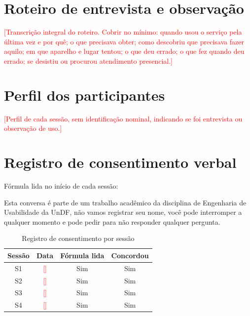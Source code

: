 \documentclass[
  12pt,
  oneside,
  a4paper,
  chapter=TITLE,
  section=TITLE,
  english,
  brazil
]{abntex2}
\newcommand{\preencher}[1]{\textcolor{red}{[#1]}}
\begin{document}
\begin{apendicesenv}
\partapendices

\chapter{Roteiro de entrevista e observação}\label{ap:roteiro}
\preencher{Transcrição integral do roteiro. Cobrir no mínimo: quando usou o
serviço pela última vez e por quê; o que precisava obter; como descobriu que
precisava fazer aquilo; em que aparelho e lugar tentou; o que deu errado; o que
fez quando deu errado; se desistiu ou procurou atendimento presencial.}

\chapter{Perfil dos participantes}\label{ap:perfil}
\preencher{Perfil de cada sessão, sem identificação nominal, indicando se foi
entrevista ou observação de uso.}

\chapter{Registro de consentimento verbal}\label{ap:consentimento}
Fórmula lida no início de cada sessão:

\begin{citacao}
Esta conversa é parte de um trabalho acadêmico da disciplina de Engenharia de
Usabilidade da UnDF, não vamos registrar seu nome, você pode interromper a
qualquer momento e pode pedir para não responder qualquer pergunta.
\end{citacao}

\begin{table}[htbp]
  \caption{Registro de consentimento por sessão}\label{tab:consentimento}
  \centering\small
  \begin{tabular}{cccc}\toprule
    \textbf{Sessão} & \textbf{Data} & \textbf{Fórmula lida} & \textbf{Concordou} \\\midrule
    S1 & \preencher{} & Sim & Sim \\
    S2 & \preencher{} & Sim & Sim \\
    S3 & \preencher{} & Sim & Sim \\
    S4 & \preencher{} & Sim & Sim \\\bottomrule
  \end{tabular}
\end{table}


\end{apendicesenv}
\end{document}
